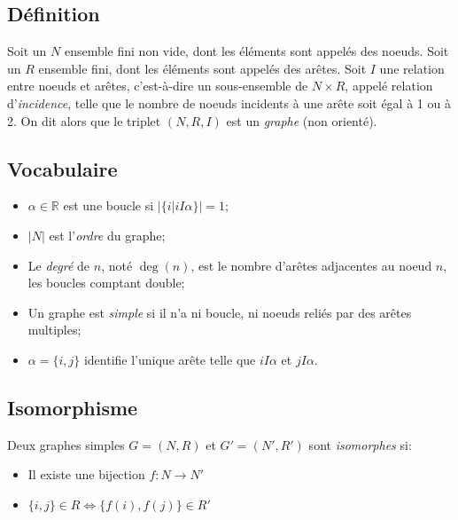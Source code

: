 \subsection{Définition}
Soit un $N$ ensemble fini non vide,
dont les éléments sont appelés des noeuds.
Soit un $R$ ensemble fini,
dont les éléments sont appelés des arêtes.
Soit $I$ une relation entre noeuds et arêtes,
c'est-à-dire un sous-ensemble de $N \times R$,
appelé relation d'\emph{incidence},
telle que le nombre de noeuds incidents à une arête soit égal à 1 ou à 2.
On dit alors que le triplet $(N, R, I)$ est un \emph{graphe} (non orienté).

\subsection{Vocabulaire}
\begin{itemize}
  \item $\alpha \in \mathbb{R}$ est une boucle si $|\{i|iI\alpha\}| = 1$;
  \item $|N|$ est l'\emph{ordre} du graphe;
  \item Le \emph{degré} de $n$, noté $\deg(n)$,
    est le nombre d'arêtes adjacentes au noeud $n$, les boucles comptant double;
  \item Un graphe est \emph{simple} si il n'a ni boucle,
    ni noeuds reliés par des arêtes multiples;
  \item $\alpha = \{i, j\}$ identifie l'unique arête
    telle que $iI\alpha$ et $jI\alpha$.
\end{itemize}
\subsection{Isomorphisme}
Deux graphes simples $G = (N,R)$ et $G' = (N',R')$ sont \emph{isomorphes} si:\\
\begin{itemize}
  \item Il existe une bijection $f : N \rightarrow N'$\\
  \item $\{i,j\} \in R \Leftrightarrow \{f(i), f(j)\} \in R'$\\
\end{itemize}
